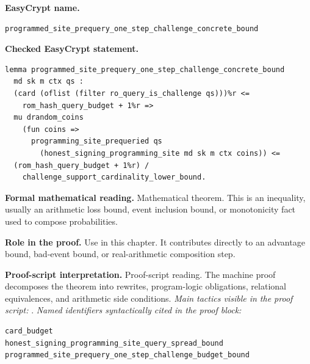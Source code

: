 \begin{formaltheorem}
\noindent\textbf{EasyCrypt name.}
\begin{lstlisting}[language=EasyCrypt,basicstyle=\ttfamily\scriptsize]
programmed_site_prequery_one_step_challenge_concrete_bound
\end{lstlisting}
\noindent\textbf{Checked EasyCrypt statement.}
\begin{lstlisting}[language=EasyCrypt,basicstyle=\ttfamily\scriptsize]
lemma programmed_site_prequery_one_step_challenge_concrete_bound
  md sk m ctx qs :
  (card (oflist (filter ro_query_is_challenge qs)))%r <=
    rom_hash_query_budget + 1%r =>
  mu drandom_coins
    (fun coins =>
      programming_site_prequeried qs
        (honest_signing_programming_site md sk m ctx coins)) <=
  (rom_hash_query_budget + 1%r) /
    challenge_support_cardinality_lower_bound.
\end{lstlisting}
\noindent\textbf{Formal mathematical reading.}
Mathematical theorem. This is an inequality, usually an arithmetic loss bound, event inclusion bound, or monotonicity fact used to compose probabilities.

\noindent\textbf{Role in the proof.}
Use in this chapter. It contributes directly to an advantage bound, bad-event bound, or real-arithmetic composition step.

\noindent\textbf{Proof-script interpretation.}
Proof-script reading. The machine proof decomposes the theorem into rewrites, program-logic obligations, relational equivalences, and arithmetic side conditions.
\emph{Main tactics visible in the proof script:} .
\emph{Named identifiers syntactically cited in the proof block:}
\begin{lstlisting}[language=EasyCrypt,basicstyle=\ttfamily\scriptsize]
card_budget
honest_signing_programming_site_query_spread_bound
programmed_site_prequery_one_step_challenge_budget_bound
\end{lstlisting}

\end{formaltheorem}

